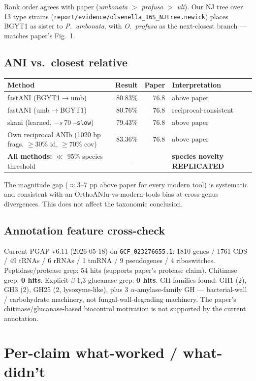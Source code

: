\documentclass[11pt]{article}
\begin{document}
Rank order agrees with paper (\emph{umbonata} $>$ \emph{profusa} $>$ \emph{uli}). Our NJ tree over 13 type strains (\texttt{report/evidence/olsenella\_16S\_NJtree.newick}) places BGYT1 as sister to \emph{P.\ umbonata}, with \emph{O.\ profusa} as the next-closest branch --- matches paper's Fig.\ 1.

\subsection{ANI vs.\ closest relative}
\begin{tabular}{@{}lrrl@{}}
\toprule
Method & Result & Paper & Interpretation \\
\midrule
fastANI (BGYT1$\to$umb) & 80.83\% & 76.8 & above paper \\
fastANI (umb$\to$BGYT1) & 80.76\% & 76.8 & reciprocal-consistent \\
skani (learned, $-s\ 70$ \texttt{--slow}) & 79.43\% & 76.8 & above paper \\
Own reciprocal ANIb (1020 bp frags, $\geq$30\% id, $\geq$70\% cov) & 83.36\% & 76.8 & above paper \\
\midrule
\textbf{All methods:} $\ll$ 95\% species threshold & --- & --- & \textbf{species novelty REPLICATED} \\
\bottomrule
\end{tabular}

The magnitude gap ($\approx$3--7 pp above paper for every modern tool) is systematic and consistent with an OrthoANIu-vs-modern-tools bias at cross-genus divergences. This does not affect the taxonomic conclusion.

\subsection{Annotation feature cross-check}
Current PGAP v6.11 (2026-05-18) on \texttt{GCF\_023276655.1}: 1810 genes / 1761 CDS / 49 tRNAs / 6 rRNAs / 1 tmRNA / 9 pseudogenes / 4 riboswitches. Peptidase/protease grep: 54 hits (supports paper's protease claim). Chitinase grep: \textbf{0 hits}. Explicit $\beta$-1,3-glucanase grep: \textbf{0 hits}. GH families found: GH1 (2), GH3 (2), GH25 (2, lysozyme-like), plus 3 $\alpha$-amylase-family GH --- bacterial-wall / carbohydrate machinery, not fungal-wall-degrading machinery. The paper's chitinase/glucanase-based biocontrol motivation is not supported by the current annotation.

\section{Per-claim what-worked / what-didn't}
\end{document}

